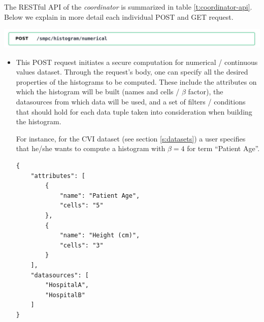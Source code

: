 The RESTful API of the \textit{coordinator} is summarized in table \ref{t:coordinator-api}.
Below we explain in more detail each individual POST and GET request.

\includegraphics[page=1,width=\textwidth]{figures/post1.pdf}
\begin{itemize}
\item[]
This POST request initiates a secure computation for numerical / continuous values dataset.
Through the request's body, one can specify all the desired properties of the histograms to be computed.
These include the attributes on which the histogram will be built (names and cells / $\beta$ factor), the datasources from which data will be used, and a set of filters / conditions that should hold for each data tuple taken into consideration when building the histogram.


For instance, for the CVI dataset (see section \ref{s:datasets}) a user specifies that he/she wants to compute a histogram with $\beta = 4$ for term ``Patient Age''.


{
\begin{verbatim}
{
    "attributes": [
        {
            "name": "Patient Age",
            "cells": "5"
        },
        {
            "name": "Height (cm)",
            "cells": "3"
        }
    ],
    "datasources": [
        "HospitalA",
        "HospitalB"
    ]
}
\end{verbatim}
\label{sc:histogram-numerical-post}
}
\end{itemize}

